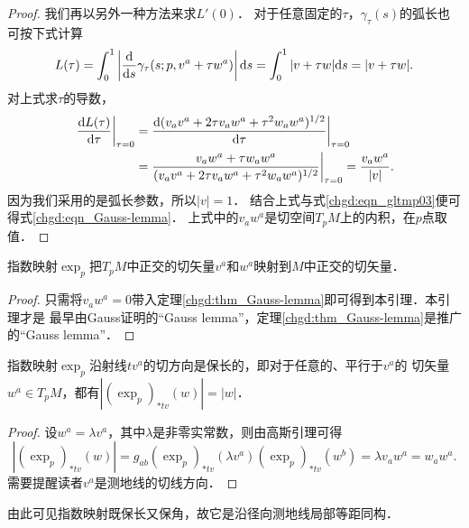 \begin{proof}
    我们再以另外一种方法来求$L'(0)$．
    对于任意固定的$\tau$，$\gamma_\tau(s)$的弧长也可按下式计算
    \begin{equation}
        L(\tau)=\int_{0}^{1} \left|\frac{{\rm d}}{{\rm d}s} \gamma_\tau(s;p,v^a+\tau w^a)\right| {\rm d}s
        =\int_{0}^{1} |v+\tau w| {\rm d}s = |v+\tau w|.
    \end{equation}
    对上式求$\tau$的导数，
    \begin{align*}
        \left.\frac{{\rm d}L(\tau)}{{\rm d}\tau}\right|_{\tau=0} =& \left.
        \frac{{\rm d} (v_av^a+2\tau v_aw^a+\tau^2 w_a w^a)^{1/2}}{{\rm d}\tau}\right|_{\tau=0}  \\
        =&\left.\frac{v_aw^a+\tau w_a w^a}{ (v_av^a+2\tau v_aw^a+\tau^2 w_a w^a)^{1/2}}\right|_{\tau=0}
        =\frac{v_aw^a}{|v|} .
    \end{align*}
    因为我们采用的是弧长参数，所以$|v|=1$．
    结合上式与式\eqref{chgd:eqn_gltmp03}便可得式\eqref{chgd:eqn_Gauss-lemma}．
    上式中的$v_aw^a$是切空间$T_p M$上的内积，在$p$点取值．
\end{proof}

\begin{lemma}\label{chgd:thm_Gauss-lemma-old}
    指数映射$\exp_{p}$把$T_pM$中正交的切矢量$v^a$和$w^a$映射到$M$中正交的切矢量．
\end{lemma}
\begin{proof}
    只需将$v_aw^a=0$带入定理\ref{chgd:thm_Gauss-lemma}即可得到本引理．本引理才是
    最早由Gauss证明的“Gauss lemma”，定理\ref{chgd:thm_Gauss-lemma}是推广的“Gauss lemma”．
\end{proof}

\begin{proposition}\label{chgd:thm_Gauss-lemma-baochang}
    指数映射$\exp_{p}$沿射线$tv^a$的切方向是保长的，即对于任意的、平行于$v^a$的
    切矢量$w^a\in T_pM$，都有$|(\exp_{p})_{*tv}(w)|=|w|$．
\end{proposition}
\begin{proof}
    设$w^a= \lambda v^a$，其中$\lambda$是非零实常数，则由高斯引理可得
    \begin{equation*}
        |(\exp_{p})_{*tv}(w)| = g_{ab}(\exp_{p})_{*tv}(\lambda v^a) (\exp_{p})_{*tv}(w^b)
        = \lambda v_a w^a = w_a w^a.
    \end{equation*}
    需要提醒读者$v^a$是测地线的切线方向．
\end{proof}

\begin{remark}\label{chgd:rmk_Gauss-lemma}
    由此可见指数映射既保长又保角，故它是沿径向测地线局部等距同构．
\end{remark}

